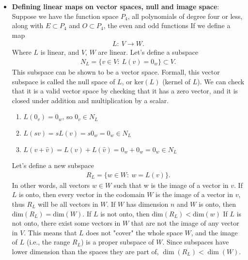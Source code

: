 \documentclass{report}
\begin{document}
\begin{itemize}
        \item \textbf{Defining linear maps on vector spaces, null and image space}: Suppose we have the function space $P_{4}$, all polynomials of degree four or less, along with $E\subset P_{4}$ and $O\subset P_{4}$, the even and odd functions
            \bigbreak \noindent 
            If we define a map
            \begin{align*}
                L:\ V \to W
            .\end{align*}
            Where $L$ is linear, and $V$, $W$ are linear. Let's define a subspace
            \begin{align*}
                N_{L} = \{v \in V :\ L(v) = 0_{w}\} \subset V
            .\end{align*}
            \bigbreak \noindent 
            This subspace can be shown to be a vector space. Formall, this vector subspace is called the null space of $L$, or $\text{ker}(L)$ (kernel of $L$).
            \bigbreak \noindent 
            We can check that it is a valid vector space by checking that it has a zero vector, and it is closed under addition and multiplication by a scalar.
            \begin{enumerate}
                \item $L(0_{v}) = 0_{w}$, so $0_{v} \in N_{L} $
                \item $L(sv) = sL(v) = s0_{w} = 0_{w} \in N_{L}$ 
                \item $L(v + \hat{v}) = L(v) + L(\hat{v}) = 0_{w} + 0_{w} = 0_{w} \in N_{L}$
            \end{enumerate}
            \bigbreak \noindent 
            Let's define a new subspace
            \begin{align*}
                R_{L} = \{w \in W :\ w = L(v)\}
            .\end{align*}
            In other words, all vectors $w\in W$ such that w is the image of a vector in $v$. If $L$ is onto, then every vector in the codomain $W$ is the image of a vector in $v$, thus $R_{L}$ will be all vectors in $W$. If $W$ has dimension $n$ and $W$ is onto, then $\text{dim}(R_{L}) = \text{dim}(W)$. If $L$ is not onto, then $\text{dim}(R_{L}) < \text{dim}(w)$
            \bigbreak \noindent 
            If \( L \) is not onto, there exist some vectors in \( W \) that are not the image of any vector in \( V \). This means that \( L \) does not "cover" the whole space \( W \), and the image of \( L \) (i.e., the range \( R_L \)) is a proper subspace of \( W \). Since subspaces have lower dimension than the spaces they are part of, \( \dim(R_L) < \dim(W) \).

\end{itemize}
\end{document}
